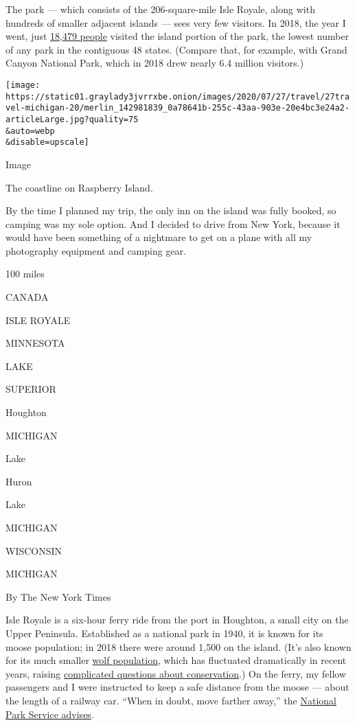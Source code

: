 The park --- which consists of the 206-square-mile Isle Royale, along
with hundreds of smaller adjacent islands --- sees very few visitors. In
2018, the year I went, just
\href{https://www.nps.gov/isro/learn/management/statistics.htm}{18,479
people} visited the island portion of the park, the lowest number of any
park in the contiguous 48 states. (Compare that, for example, with Grand
Canyon National Park, which in 2018 drew nearly 6.4 million visitors.)

\texttt{[image: https://static01.graylady3jvrrxbe.onion/images/2020/07/27/travel/27travel-michigan-20/merlin\_142981839\_0a78641b-255c-43aa-903e-20e4bc3e24a2-articleLarge.jpg?quality=75\\\&auto=webp\\\&disable=upscale]}

Image

The coastline on Raspberry Island.

By the time I planned my trip, the only inn on the island was fully
booked, so camping was my sole option. And I decided to drive from New
York, because it would have been something of a nightmare to get on a
plane with all my photography equipment and camping gear.

100 miles

CANADA

ISLE ROYALE

MINNESOTA

LAKE

SUPERIOR

Houghton

MICHIGAN

Lake

Huron

Lake

MICHIGAN

WISCONSIN

MICHIGAN

By The New York Times

Isle Royale is a six-hour ferry ride from the port in Houghton, a small
city on the Upper Peninsula. Established as a national park in 1940, it
is known for its moose population; in 2018 there were around 1,500 on
the island. (It's also known for its much smaller
\href{https://www.nps.gov/isro/learn/nature/wolf-moose-populations.htm}{wolf
population}, which has fluctuated dramatically in recent years, raising
\href{https://www.nytimes3xbfgragh.onion/2013/05/09/opinion/save-the-wolves-of-isle-royale-national-park.html}{complicated
questions about conservation}.) On the ferry, my fellow passengers and I
were instructed to keep a safe distance from the moose --- about the
length of a railway car. ``When in doubt, move farther away,'' the
\href{https://www.nps.gov/isro/learn/nature/moose.htm}{National Park
Service advises}.

